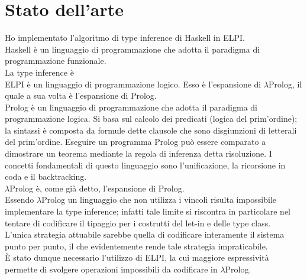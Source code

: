 \documentclass[12pt,a4paper,openright,twoside]{report}
\begin{document}
\section{Stato dell'arte}
Ho implementato l'algoritmo di type inference di Haskell in ELPI.\\
Haskell è un linguaggio di programmazione che adotta il paradigma di programmazione funzionale.\\
La type inference è \\%
ELPI è un linguaggio di programmazione logico. Esso è l'espansione di $\lambda$Prolog, il quale a sua volta è l'espansione di Prolog.\\
Prolog è un linguaggio di programmazione che adotta il paradigma di programmazione logica. Si basa sul calcolo dei predicati (logica del prim'ordine); la sintassi è composta da formule dette clausole che sono disgiunzioni di letterali del prim'ordine. Eseguire un programma Prolog può essere comparato a dimostrare un teorema mediante la regola di inferenza detta risoluzione. I concetti fondamentali di questo linguaggio sono l'unificazione, la ricorsione in coda e il backtracking.\\
$\lambda$Prolog è, come già detto, l'espansione di Prolog. \\%
Essendo $\lambda$Prolog un linguaggio che non utilizza i vincoli risulta impossibile implementare la type inference; infatti tale limite si riscontra in particolare nel tentare di codificare il tipaggio per i costrutti del let-in e delle type class.\\
L'unica strategia attuabile sarebbe quella di codificare interamente il sistema punto per punto, il che evidentemente rende tale strategia impraticabile.\\
È stato dunque necessario l'utilizzo di ELPI, la cui maggiore espressività permette di svolgere operazioni impossibili da codificare in $\lambda$Prolog.
\end{document}
